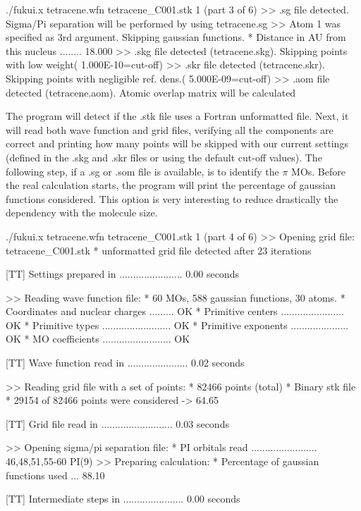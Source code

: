 \documentclass[a4paper,11pt,openany]{memoir}
\begin{document}
\begin{consola}{./fukui.x tetracene.wfn tetracene\_C001.stk 1 (part 3 of 6)}
>> .sg file detected. Sigma/Pi separation will be performed by using tetracene.sg
>> Atom 1 was specified as 3rd argument. Skipping gaussian functions.
* Distance in AU from this nucleus ........ 18.000
>> .skg file detected (tetracene.skg). Skipping points with low weight( 1.000E-10=cut-off)
>> .skr file detected (tetracene.skr). Skipping points with negligible ref. dens.( 5.000E-09=cut-off)
>> .aom file detected (tetracene.aom). Atomic overlap matrix will be calculated
\end{consola}
The program will detect if the .stk file uses a Fortran unformatted file. Next, it will read both wave function and grid files, verifying all the components are correct and printing how many points will be skipped with our current settings (defined in the .skg and .skr files or using the default cut-off values). The following step, if a .sg or .som file is available, is to identify the $\pi$ \acp{MO}. Before the real calculation starts, the program will print the percentage of gaussian functions considered. This option is very interesting to reduce drastically the dependency with the molecule size.
\begin{consola}{./fukui.x tetracene.wfn tetracene\_C001.stk 1 (part 4 of 6)}
>> Opening grid file: tetracene_C001.stk
* unformatted grid file detected after 23 iterations

[TT] Settings prepared in ....................... 0.00 seconds

>> Reading wave function file:
* 60 MOs, 588 gaussian functions, 30 atoms.
* Coordinates and nuclear charges ......... OK
* Primitive centers ....................... OK
* Primitive types ......................... OK
* Primitive exponents ..................... OK
* MO coefficients ......................... OK

[TT] Wave function read in ...................... 0.02 seconds

>> Reading grid file with a set of points:
* 82466 points (total)
* Binary stk file
* 29154 of 82466 points were considered ->  64.65%

[TT] Grid file read in .......................... 0.03 seconds

>> Opening sigma/pi separation file:
* PI orbitals read ........................ 46,48,51,55-60 PI(9)
>> Preparing calculation:
* Percentage of gaussian functions used ... 88.10%

[TT] Intermediate steps in ...................... 0.00 seconds
\end{consola}
\end{document}
